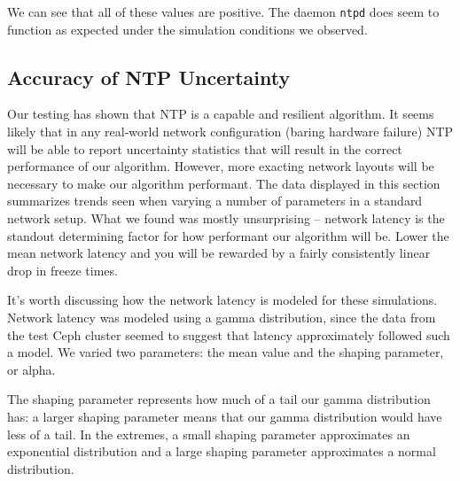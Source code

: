 We can see that all of these values are positive. The daemon \texttt{ntpd} 
does seem to function as expected under the simulation conditions we observed. 

\subsection{Accuracy of NTP Uncertainty}

Our testing has shown that NTP is a capable and resilient
algorithm. It seems likely that in any real-world network
configuration (baring hardware failure) NTP will be able to report
uncertainty statistics that will result in the correct performance of our
algorithm. However, more exacting network layouts will be necessary to
make our algorithm performant. The data displayed in this section
summarizes trends seen when varying a number of parameters in a
standard network setup. What we found was mostly unsurprising -- network 
latency is the standout determining factor for how performant
our algorithm will be. Lower the mean network latency and you will be
rewarded by a fairly consistently linear drop in freeze times.

It's worth discussing how the network latency is modeled for these
simulations. Network latency was modeled using a gamma distribution,
since the data from the test Ceph cluster seemed to suggest that
latency approximately followed such a model. We varied two parameters:
the mean value and the shaping parameter, or alpha.

The shaping parameter represents how much of a tail our gamma
distribution has: a larger shaping parameter means that our gamma
distribution would have less of a tail. In the extremes, a small
shaping parameter approximates an exponential distribution and a large
shaping parameter approximates a normal distribution.


